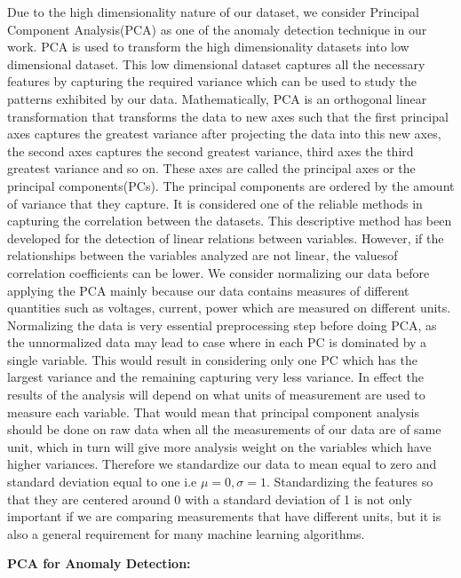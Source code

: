 Due to the high dimensionality nature of our dataset, we consider Principal Component Analysis(PCA) as one of the anomaly detection technique in our work. PCA is used to transform the high dimensionality datasets into low dimensional dataset. This low dimensional dataset captures all the necessary features by capturing the required variance which can be used to study the patterns exhibited by our data. Mathematically, PCA is an orthogonal linear transformation that transforms the data to new axes such that the first principal axes captures the greatest variance after projecting the data into this new axes, the second axes captures the second greatest variance, third axes the third greatest variance and so on. These axes are called the principal axes or the principal components(PCs). The principal components are ordered by the amount of variance that they capture. It is considered one of the reliable methods in capturing the correlation between the datasets. This descriptive method has been developed for the detection of linear relations between variables. However, if the relationships between the variables analyzed are not linear, the values ​​of correlation coefficients can be  lower. 
	We consider normalizing our data before applying the PCA mainly because our data contains measures of different quantities such as voltages, current, power which are measured on different units. Normalizing the data is very essential preprocessing step before doing PCA, as the unnormalized data may lead to case where in each PC is dominated by a single variable. This would result in considering only one PC which has the largest variance and the remaining capturing very less variance.  In effect the results of the analysis will depend on what units of measurement are used to measure each variable. That would mean that principal component analysis should be done on raw data when all the measurements of our data are of same unit, which in turn will give more analysis weight on the variables which have higher variances. Therefore we standardize our data to mean equal to zero and standard deviation equal to one i.e $\mu = 0 ,  \sigma = 1 $. Standardizing the features so that they are centered around 0 with a standard deviation of 1 is not only important if we are comparing measurements that have different units, but it is also a general requirement for many machine learning algorithms.

\textbf{PCA for Anomaly Detection:} 


